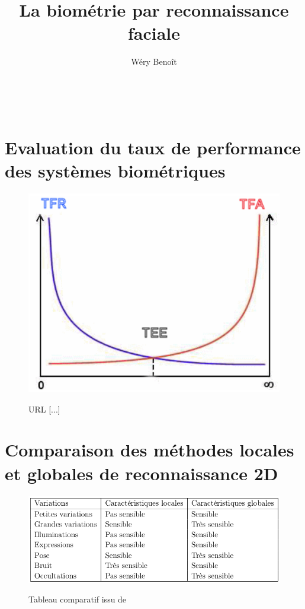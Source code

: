 \documentclass{sig-alternate-05-2015}
\begin{document}
\title{La biométrie par reconnaissance faciale}
\author{
Wéry Benoît\\
       \\
       \\
       \affaddr{\today}\\
}
\maketitle

\begin{abstract}
\end{abstract}





%





\appendix
\section{Evaluation du taux de performance des systèmes biométriques}
\begin{figure}[h!]
\center\includegraphics[scale=.5]{images/performances-systeme}\label{perfo-systeme}
\caption{URL [...]}
\end{figure}
\section{Comparaison des méthodes locales et globales de reconnaissance 2D}
\begin{figure}[h!]
\center\includegraphics[scale=.4]{images/locales-vs-globales}\label{locales-vs-globales}
\caption{Tableau comparatif issu de \cite{Xphdthesis_1}}
\end{figure}
\end{document}

